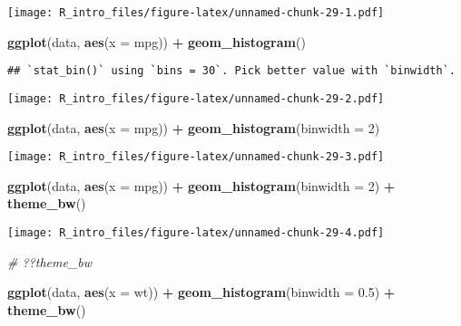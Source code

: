 \documentclass[
  a4paper,
]{article}
\newenvironment{Shaded}{\begin{snugshade}}{\end{snugshade}}
\newcommand{\AttributeTok}[1]{\textcolor[rgb]{0.13,0.29,0.53}{#1}}
\newcommand{\CommentTok}[1]{\textcolor[rgb]{0.56,0.35,0.01}{\textit{#1}}}
\newcommand{\DecValTok}[1]{\textcolor[rgb]{0.00,0.00,0.81}{#1}}
\newcommand{\FloatTok}[1]{\textcolor[rgb]{0.00,0.00,0.81}{#1}}
\newcommand{\FunctionTok}[1]{\textcolor[rgb]{0.13,0.29,0.53}{\textbf{#1}}}
\newcommand{\NormalTok}[1]{#1}
\newcommand{\SpecialCharTok}[1]{\textcolor[rgb]{0.81,0.36,0.00}{\textbf{#1}}}
\begin{document}
\texttt{[image: R\_intro\_files/figure-latex/unnamed-chunk-29-1.pdf]}

\begin{Shaded}
\begin{Highlighting}[]
\FunctionTok{ggplot}\NormalTok{(data, }\FunctionTok{aes}\NormalTok{(}\AttributeTok{x =}\NormalTok{ mpg)) }\SpecialCharTok{+} \FunctionTok{geom\_histogram}\NormalTok{()}
\end{Highlighting}
\end{Shaded}

\begin{verbatim}
## `stat_bin()` using `bins = 30`. Pick better value with `binwidth`.
\end{verbatim}

\texttt{[image: R\_intro\_files/figure-latex/unnamed-chunk-29-2.pdf]}

\begin{Shaded}
\begin{Highlighting}[]
\FunctionTok{ggplot}\NormalTok{(data, }\FunctionTok{aes}\NormalTok{(}\AttributeTok{x =}\NormalTok{ mpg)) }\SpecialCharTok{+} \FunctionTok{geom\_histogram}\NormalTok{(}\AttributeTok{binwidth =} \DecValTok{2}\NormalTok{)}
\end{Highlighting}
\end{Shaded}

\texttt{[image: R\_intro\_files/figure-latex/unnamed-chunk-29-3.pdf]}

\begin{Shaded}
\begin{Highlighting}[]
\FunctionTok{ggplot}\NormalTok{(data, }\FunctionTok{aes}\NormalTok{(}\AttributeTok{x =}\NormalTok{ mpg)) }\SpecialCharTok{+} \FunctionTok{geom\_histogram}\NormalTok{(}\AttributeTok{binwidth =} \DecValTok{2}\NormalTok{) }\SpecialCharTok{+} \FunctionTok{theme\_bw}\NormalTok{()}
\end{Highlighting}
\end{Shaded}

\texttt{[image: R\_intro\_files/figure-latex/unnamed-chunk-29-4.pdf]}

\begin{Shaded}
\begin{Highlighting}[]
\CommentTok{\# ??theme\_bw}

\FunctionTok{ggplot}\NormalTok{(data, }\FunctionTok{aes}\NormalTok{(}\AttributeTok{x =}\NormalTok{ wt)) }\SpecialCharTok{+} \FunctionTok{geom\_histogram}\NormalTok{(}\AttributeTok{binwidth =} \FloatTok{0.5}\NormalTok{) }\SpecialCharTok{+}
    \FunctionTok{theme\_bw}\NormalTok{()}
\end{Highlighting}
\end{Shaded}
\end{document}
